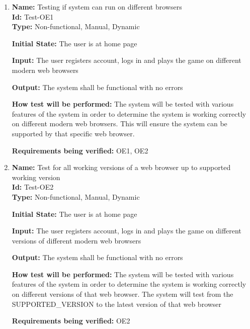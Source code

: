 \documentclass[12pt, titlepage]{article}
\begin{document}
\begin{enumerate}
    \item{\textbf{Name: }Testing if system can run on different browsers\\} \label{Test-OE1}
    \textbf{Id: }Test-OE1\\
    
   \textbf{Type:} Non-functional, Manual, Dynamic
    					
    \textbf{Initial State:} The user is at home page
    					
   \textbf{Input:} The user registers account, logs in and plays the game on different modern web browsers
    					
   \textbf{Output: }The system shall be functional with no errors
    					
   \textbf{How test will be performed: }The system will be tested with various features of the system in order to determine the system is working correctly on different modern web browsers. This will ensure the system can be supported by that specific web browser.
   
   \textbf{Requirements being verified:} OE1, OE2
    
    \item{\textbf{Name: }Test for all working versions of a web browser up to supported working version \\} \label{Test-OE2}
    \textbf{Id: }Test-OE2\\
    
    \textbf{Type:} Non-functional, Manual, Dynamic
    					
    \textbf{Initial State: }The user is at home page
    					
   \textbf{Input:} The user registers account, logs in and plays the game on different versions of different modern web browsers
    					
    \textbf{Output:} The system shall be functional with no errors
    					
    \textbf{How test will be performed:} The system will be tested with various features of the system in order to determine the system is working correctly on different versions of that web browser. The system will test from the SUPPORTED\_VERSION to the latest version of that web browser
    
    \textbf{Requirements being verified:} OE2
\end{enumerate}
\end{document}
